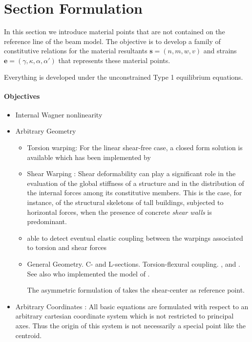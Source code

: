\section{Section Formulation}\label{sec:gensec}

\begin{Quote}
In this section we introduce material points that are not contained on the reference line of the beam model. 
The objective is to develop a family of constitutive relations for the material resultants \(\bm{s} = (n,m,w,v)\) and strains \(\bm{e} = (\gamma,\kappa,\alpha,\alpha')\) that represents these material points.

Everything is developed under the unconstrained Type 1 equilibrium equations.
\end{Quote}

\paragraph{Objectives}
\begin{itemize}
\item Internal Wagner nonlinearity
\item Arbitrary Geometry 
\begin{itemize}

    \item Torsion warping: For the linear shear-free case, a closed form solution is available which has been implemented by \cite{chaudhary1982generalized}

    \item Shear Warping : Shear deformability can play a significant role in the evaluation of the global stiffness of a structure and in the distribution of the internal forces among its constitutive members. This is the case, for instance, of the structural skeletons of tall buildings, subjected to horizontal forces, when the presence of concrete \emph{shear walls} is predominant.

    \item able to detect eventual elastic coupling between the warpings associated to torsion and shear forces
    
    \item General Geometry. C- and L-sections. Torsion-flexural coupling. \cite{kim2005exact,elfatmi2007nonuniform}, and \cite{du2020threedimensional}. 
    See also \cite{lewinski2021incorporating} who implemented the model of \cite{elfatmi2007nonuniform}.

    The asymmetric formulation of \cite{hsiao2000corotational} takes the shear-center as reference point.
\end{itemize}

\item Arbitrary Coordinates : All basic equations are formulated with respect to an arbitrary cartesian coordinate system which is not restricted to principal axes. 
Thus the origin of this system is not necessarily a special point like the centroid. 

\end{itemize}



